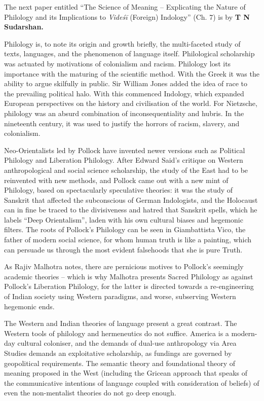 The next paper entitled “The Science of Meaning – Explicating the Nature of Philology and its Implications to \textit{Videśī} (Foreign) Indology” (Ch. 7) is by \textbf{T N Sudarshan.}

 Philology is, to note its origin and growth briefly, the multi-faceted study of texts, languages, and the phenomenon of language itself. Philological scholarship was actuated by motivations of colonialism and racism. Philology lost its importance with the maturing of the scientific method. With the Greek it was the ability to argue skilfully in public. Sir William Jones added the idea of race to the prevailing political halo. With this commenced Indology, which expanded European perspectives on the history and civilisation of the world. For Nietzsche, philology was an absurd combination of inconsequentiality and hubris. In the nineteenth century, it was used to justify the horrors of racism, slavery, and colonialism. 

Neo-Orientalists led by Pollock have invented newer versions such as Political Philology and Liberation Philology. After Edward Said’s critique on Western anthropological and social science scholarship, the study of the East had to be reinvented with new methods, and Pollock came out with a new mint of Philology, based on spectacularly speculative theories: it was the study of Sanskrit that affected the subconscious of German Indologists, and the Holocaust can in fine be traced to the divisiveness and hatred that Sanskrit spells, which he labels “Deep Orientalism”, laden with his own cultural biases and hegemonic filters. The roots of Pollock’s Philology can be seen in Giambattista Vico, the father of modern social science, for whom human truth is like a painting, which can persuade us through the most evident falsehoods that she is pure Truth. 

As Rajiv Malhotra notes, there are pernicious motives to Pollock’s seemingly academic theories – which is why Malhotra presents Sacred Philology as against Pollock’s Liberation Philology, for the latter is directed towards a re-engineering of Indian society using Western paradigms, and worse, subserving Western hegemonic ends.

The Western and Indian theories of language present a great contrast. The Western tools of philology and hermeneutics do not suffice. America is a modern-day cultural coloniser, and the demands of dual-use anthropology via Area Studies demands an exploitative scholarship, as fundings are governed by geopolitical requirements. The semantic theory and foundational theory of meaning proposed in the West (including the Gricean approach that speaks of the communicative intentions of language coupled with consideration of beliefs) of even the non-mentalist theories do not go deep enough.

